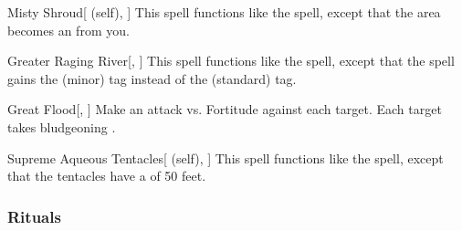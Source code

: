 \lowercase{\hypertarget{spell:Misty Shroud}{}}\label{spell:Misty Shroud}
\begin{attuneability}[Rank 5]{\hypertarget{spell:Misty Shroud}{Misty Shroud}}[ (self), ]
\targetrule
This spell functions like the  spell, except that the area becomes an  from you.
\end{attuneability}
\vspace{0.25em}



\lowercase{\hypertarget{spell:Greater Raging River}{}}\label{spell:Greater Raging River}
\begin{freeability}[Rank 6]{\hypertarget{spell:Greater Raging River}{Greater Raging River}}[, ]
This spell functions like the  spell, except that the spell gains the  (minor) tag instead of the  (standard) tag.
\end{freeability}
\vspace{0.25em}



\lowercase{\hypertarget{spell:Great Flood}{}}\label{spell:Great Flood}
\begin{freeability}[Rank 7]{\hypertarget{spell:Great Flood}{Great Flood}}[, ]
Make an attack vs. Fortitude against each target.
\hit Each target takes bludgeoning .
\end{freeability}
\vspace{0.25em}



\lowercase{\hypertarget{spell:Supreme Aqueous Tentacles}{}}\label{spell:Supreme Aqueous Tentacles}
\begin{attuneability}[Rank 7]{\hypertarget{spell:Supreme Aqueous Tentacles}{Supreme Aqueous Tentacles}}[ (self), ]
This spell functions like the  spell, except that the tentacles have a  of 50 feet.
\end{attuneability}
\vspace{0.25em}



\subsubsection{Rituals}


